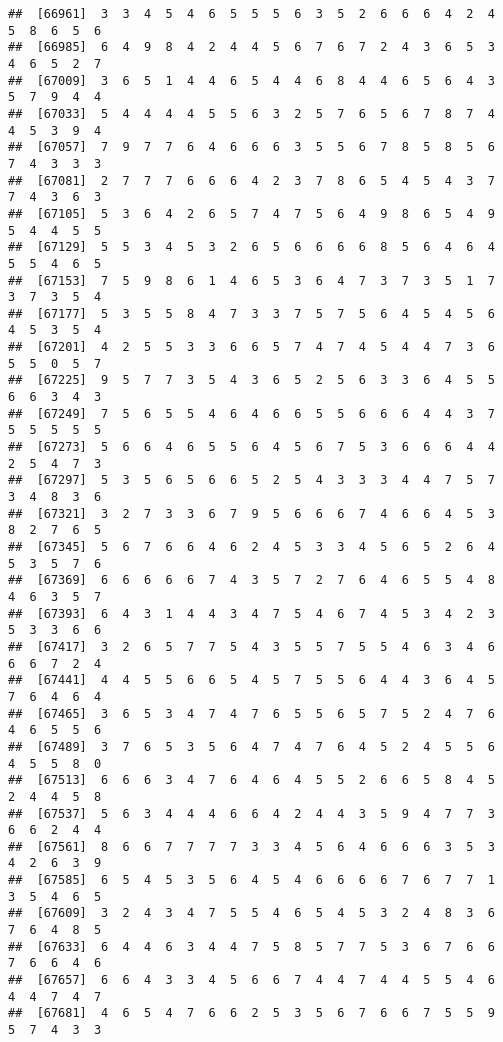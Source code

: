 \documentclass[
]{book}
\begin{document}
\begin{verbatim}
##  [66961]  3  3  4  5  4  6  5  5  5  6  3  5  2  6  6  6  4  2  4  5  8  6  5  6
##  [66985]  6  4  9  8  4  2  4  4  5  6  7  6  7  2  4  3  6  5  3  4  6  5  2  7
##  [67009]  3  6  5  1  4  4  6  5  4  4  6  8  4  4  6  5  6  4  3  5  7  9  4  4
##  [67033]  5  4  4  4  4  5  5  6  3  2  5  7  6  5  6  7  8  7  4  4  5  3  9  4
##  [67057]  7  9  7  7  6  4  6  6  6  3  5  5  6  7  8  5  8  5  6  7  4  3  3  3
##  [67081]  2  7  7  7  6  6  6  4  2  3  7  8  6  5  4  5  4  3  7  7  4  3  6  3
##  [67105]  5  3  6  4  2  6  5  7  4  7  5  6  4  9  8  6  5  4  9  5  4  4  5  5
##  [67129]  5  5  3  4  5  3  2  6  5  6  6  6  6  8  5  6  4  6  4  5  5  4  6  5
##  [67153]  7  5  9  8  6  1  4  6  5  3  6  4  7  3  7  3  5  1  7  3  7  3  5  4
##  [67177]  5  3  5  5  8  4  7  3  3  7  5  7  5  6  4  5  4  5  6  4  5  3  5  4
##  [67201]  4  2  5  5  3  3  6  6  5  7  4  7  4  5  4  4  7  3  6  5  5  0  5  7
##  [67225]  9  5  7  7  3  5  4  3  6  5  2  5  6  3  3  6  4  5  5  6  6  3  4  3
##  [67249]  7  5  6  5  5  4  6  4  6  6  5  5  6  6  6  4  4  3  7  5  5  5  5  5
##  [67273]  5  6  6  4  6  5  5  6  4  5  6  7  5  3  6  6  6  4  4  2  5  4  7  3
##  [67297]  5  3  5  6  5  6  6  5  2  5  4  3  3  3  4  4  7  5  7  3  4  8  3  6
##  [67321]  3  2  7  3  3  6  7  9  5  6  6  6  7  4  6  6  4  5  3  8  2  7  6  5
##  [67345]  5  6  7  6  6  4  6  2  4  5  3  3  4  5  6  5  2  6  4  5  3  5  7  6
##  [67369]  6  6  6  6  6  7  4  3  5  7  2  7  6  4  6  5  5  4  8  4  6  3  5  7
##  [67393]  6  4  3  1  4  4  3  4  7  5  4  6  7  4  5  3  4  2  3  5  3  3  6  6
##  [67417]  3  2  6  5  7  7  5  4  3  5  5  7  5  5  4  6  3  4  6  6  6  7  2  4
##  [67441]  4  4  5  5  6  6  5  4  5  7  5  5  6  4  4  3  6  4  5  7  6  4  6  4
##  [67465]  3  6  5  3  4  7  4  7  6  5  5  6  5  7  5  2  4  7  6  4  6  5  5  6
##  [67489]  3  7  6  5  3  5  6  4  7  4  7  6  4  5  2  4  5  5  6  4  5  5  8  0
##  [67513]  6  6  6  3  4  7  6  4  6  4  5  5  2  6  6  5  8  4  5  2  4  4  5  8
##  [67537]  5  6  3  4  4  4  6  6  4  2  4  4  3  5  9  4  7  7  3  6  6  2  4  4
##  [67561]  8  6  6  7  7  7  7  3  3  4  5  6  4  6  6  6  3  5  3  4  2  6  3  9
##  [67585]  6  5  4  5  3  5  6  4  5  4  6  6  6  6  7  6  7  7  1  3  5  4  6  5
##  [67609]  3  2  4  3  4  7  5  5  4  6  5  4  5  3  2  4  8  3  6  7  6  4  8  5
##  [67633]  6  4  4  6  3  4  4  7  5  8  5  7  7  5  3  6  7  6  6  7  6  6  4  6
##  [67657]  6  6  4  3  3  4  5  6  6  7  4  4  7  4  4  5  5  4  6  4  4  7  4  7
##  [67681]  4  6  5  4  7  6  6  2  5  3  5  6  7  6  6  7  5  5  9  5  7  4  3  3

\end{verbatim}
\end{document}

